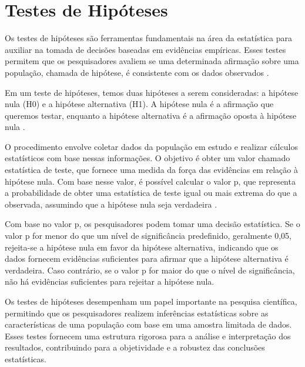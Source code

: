 \chapter{Testes de Hipóteses}

Os testes de hipóteses são ferramentas fundamentais na área da estatística para auxiliar na tomada de decisões baseadas em evidências empíricas. Esses testes permitem que os pesquisadores avaliem se uma determinada afirmação sobre uma população, chamada de hipótese, é consistente com os dados observados \parencite{Triola2017}.

Em um teste de hipóteses, temos duas hipóteses a serem consideradas: a hipótese nula (H0) e a hipótese alternativa (H1). A hipótese nula é a afirmação que queremos testar, enquanto a hipótese alternativa é a afirmação oposta à hipótese nula \parencite{Bussab2017}.

O procedimento envolve coletar dados da população em estudo e realizar cálculos estatísticos com base nessas informações. O objetivo é obter um valor chamado estatística de teste, que fornece uma medida da força das evidências em relação à hipótese nula. Com base nesse valor, é possível calcular o valor p, que representa a probabilidade de obter uma estatística de teste igual ou mais extrema do que a observada, assumindo que a hipótese nula seja verdadeira \parencite{Magalhaes2015}.

Com base no valor p, os pesquisadores podem tomar uma decisão estatística. Se o valor p for menor do que um nível de significância predefinido, geralmente 0,05, rejeita-se a hipótese nula em favor da hipótese alternativa, indicando que os dados fornecem evidências suficientes para afirmar que a hipótese alternativa é verdadeira. Caso contrário, se o valor p for maior do que o nível de significância, não há evidências suficientes para rejeitar a hipótese nula.

Os testes de hipóteses desempenham um papel importante na pesquisa científica, permitindo que os pesquisadores realizem inferências estatísticas sobre as características de uma população com base em uma amostra limitada de dados. Esses testes fornecem uma estrutura rigorosa para a análise e interpretação dos resultados, contribuindo para a objetividade e a robustez das conclusões estatísticas.